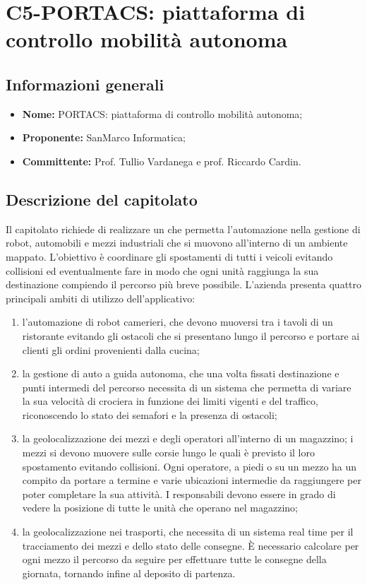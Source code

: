 \section{C5-PORTACS: piattaforma di controllo mobilità autonoma}
\subsection{Informazioni generali}
\begin{itemize}
\item \textbf{Nome:} PORTACS: piattaforma di controllo mobilità autonoma;
\item \textbf{Proponente:} SanMarco Informatica;
\item \textbf{Committente:} Prof. Tullio Vardanega e prof. Riccardo Cardin.
\end{itemize}

\subsection{Descrizione del capitolato}
Il capitolato richiede di realizzare un  che permetta l’automazione nella gestione di robot, automobili e mezzi industriali che si muovono all’interno di un ambiente mappato. L’obiettivo è coordinare gli spostamenti di tutti i veicoli evitando collisioni ed eventualmente fare in modo che ogni unità raggiunga la sua destinazione compiendo il percorso più breve possibile. 
L’azienda presenta quattro principali ambiti di utilizzo dell’applicativo:
\begin{enumerate}
\item l’automazione di robot camerieri, che devono muoversi tra i tavoli di un ristorante evitando gli ostacoli che si presentano lungo il percorso e portare ai clienti gli ordini provenienti dalla cucina;
\item la gestione di auto a guida autonoma, che una volta fissati destinazione e punti intermedi del percorso necessita di un sistema che permetta di variare la sua velocità di crociera in funzione dei limiti vigenti e del traffico, riconoscendo lo stato dei semafori e la presenza di ostacoli;
\item la geolocalizzazione dei mezzi e degli operatori all’interno di un magazzino; i mezzi si devono muovere sulle corsie lungo le quali è previsto il loro spostamento evitando collisioni. Ogni operatore, a piedi o su un mezzo ha un compito da portare a termine e varie ubicazioni intermedie da raggiungere per poter completare la sua attività. I responsabili devono essere in grado di vedere la posizione di tutte le unità che operano nel magazzino; 
\item la geolocalizzazione nei trasporti, che necessita di un sistema real time per il tracciamento dei mezzi e dello stato delle consegne. È necessario calcolare per ogni mezzo il percorso da seguire per effettuare tutte le consegne della giornata, tornando infine al deposito di partenza.
\end{enumerate}

